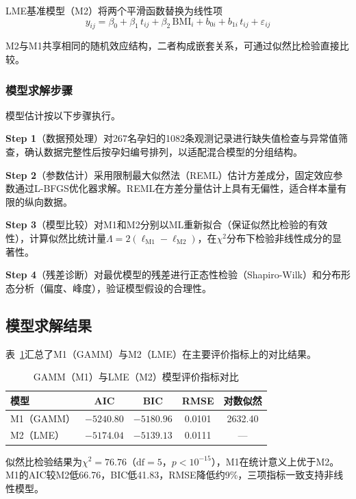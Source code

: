LME基准模型（M2）将两个平滑函数替换为线性项
\begin{equation}\label{eq:lme}
  y_{ij} = \beta_0 + \beta_1\,t_{ij} + \beta_2\,\mathrm{BMI}_i + b_{0i} + b_{1i}\,t_{ij} + \varepsilon_{ij}
\end{equation}

M2与M1共享相同的随机效应结构，二者构成嵌套关系，可通过似然比检验直接比较。

\subsubsection{模型求解步骤}

模型估计按以下步骤执行。

\textbf{Step 1}（数据预处理）\quad 对267名孕妇的1082条观测记录进行缺失值检查与异常值筛查，确认数据完整性后按孕妇编号排列，以适配混合模型的分组结构。

\textbf{Step 2}（参数估计）\quad 采用限制最大似然法（REML）估计方差成分，固定效应参数通过L-BFGS优化器求解。REML在方差分量估计上具有无偏性，适合样本量有限的纵向数据。

\textbf{Step 3}（模型比较）\quad 对M1和M2分别以ML重新拟合（保证似然比检验的有效性），计算似然比统计量$\Lambda = 2(\ell_{\mathrm{M1}} - \ell_{\mathrm{M2}})$，在$\chi^2$分布下检验非线性成分的显著性。

\textbf{Step 4}（残差诊断）\quad 对最优模型的残差进行正态性检验（Shapiro-Wilk）和分布形态分析（偏度、峰度），验证模型假设的合理性。

\subsection{模型求解结果}

表~\ref{tab:q1-compare}汇总了M1（GAMM）与M2（LME）在主要评价指标上的对比结果。

\begin{table}[H]
  \centering
  \caption{GAMM（M1）与LME（M2）模型评价指标对比}\label{tab:q1-compare}
  \begin{tabular}{lcccc}
    \toprule
    模型 & AIC & BIC & RMSE & 对数似然 \\
    \midrule
    M1（GAMM） & $-5240.80$ & $-5180.96$ & 0.0101 & 2632.40 \\
    M2（LME）  & $-5174.04$ & $-5139.13$ & 0.0111 & --- \\
    \bottomrule
  \end{tabular}
\end{table}

似然比检验结果为$\chi^2=76.76$（$\mathrm{df}=5$，$p<10^{-15}$），M1在统计意义上优于M2。M1的AIC较M2低66.76，BIC低41.83，RMSE降低约9\%，三项指标一致支持非线性模型。

